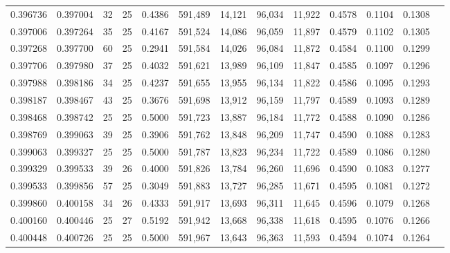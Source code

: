 \begin{tabular}{rrrrrrrrrrrrr}
0.396736 & 0.397004 &    32 &  25 &                                     0.4386 & 591,489 &  14,121 &  96,034 &  11,922 & 0.4578 & 0.1104 & 0.1308 \\
0.397006 & 0.397264 &    35 &  25 &                                     0.4167 & 591,524 &  14,086 &  96,059 &  11,897 & 0.4579 & 0.1102 & 0.1305 \\
0.397268 & 0.397700 &    60 &  25 &                                     0.2941 & 591,584 &  14,026 &  96,084 &  11,872 & 0.4584 & 0.1100 & 0.1299 \\
0.397706 & 0.397980 &    37 &  25 &                                     0.4032 & 591,621 &  13,989 &  96,109 &  11,847 & 0.4585 & 0.1097 & 0.1296 \\
0.397988 & 0.398186 &    34 &  25 &                                     0.4237 & 591,655 &  13,955 &  96,134 &  11,822 & 0.4586 & 0.1095 & 0.1293 \\
0.398187 & 0.398467 &    43 &  25 &                                     0.3676 & 591,698 &  13,912 &  96,159 &  11,797 & 0.4589 & 0.1093 & 0.1289 \\
0.398468 & 0.398742 &    25 &  25 &                                     0.5000 & 591,723 &  13,887 &  96,184 &  11,772 & 0.4588 & 0.1090 & 0.1286 \\
0.398769 & 0.399063 &    39 &  25 &                                     0.3906 & 591,762 &  13,848 &  96,209 &  11,747 & 0.4590 & 0.1088 & 0.1283 \\
0.399063 & 0.399327 &    25 &  25 &                                     0.5000 & 591,787 &  13,823 &  96,234 &  11,722 & 0.4589 & 0.1086 & 0.1280 \\
0.399329 & 0.399533 &    39 &  26 &                                     0.4000 & 591,826 &  13,784 &  96,260 &  11,696 & 0.4590 & 0.1083 & 0.1277 \\
0.399533 & 0.399856 &    57 &  25 &                                     0.3049 & 591,883 &  13,727 &  96,285 &  11,671 & 0.4595 & 0.1081 & 0.1272 \\
0.399860 & 0.400158 &    34 &  26 &                                     0.4333 & 591,917 &  13,693 &  96,311 &  11,645 & 0.4596 & 0.1079 & 0.1268 \\
0.400160 & 0.400446 &    25 &  27 &                                     0.5192 & 591,942 &  13,668 &  96,338 &  11,618 & 0.4595 & 0.1076 & 0.1266 \\
0.400448 & 0.400726 &    25 &  25 &                                     0.5000 & 591,967 &  13,643 &  96,363 &  11,593 & 0.4594 & 0.1074 & 0.1264 \\

\end{tabular}
